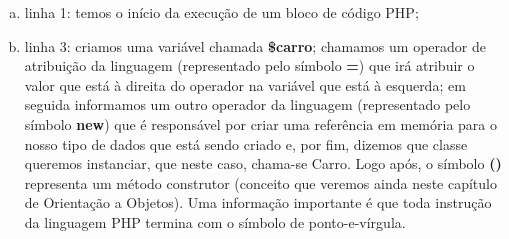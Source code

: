 \begin{enumerate}[a)]
    \item linha 1: temos o início da execução de um bloco de código PHP;
    \item linha 3: criamos uma variável chamada \textbf{\$carro};
    chamamos um operador de atribuição da linguagem (representado pelo símbolo
    \textbf{=}) que irá atribuir o valor que está à direita do operador na
    variável que está à esquerda; em seguida informamos um outro operador da 
    linguagem (representado pelo símbolo \textbf{new}) que é responsável por
    criar uma referência em memória para o nosso tipo de dados que está sendo 
    criado e, por fim, dizemos que classe queremos instanciar, que neste caso, 
    chama-se Carro. Logo após, o símbolo \textbf{()} representa um método
    construtor (conceito que veremos ainda neste capítulo de Orientação a Objetos). 
    Uma informação importante é que toda instrução da linguagem PHP termina 
    com o símbolo de ponto-e-vírgula.
\end{enumerate}